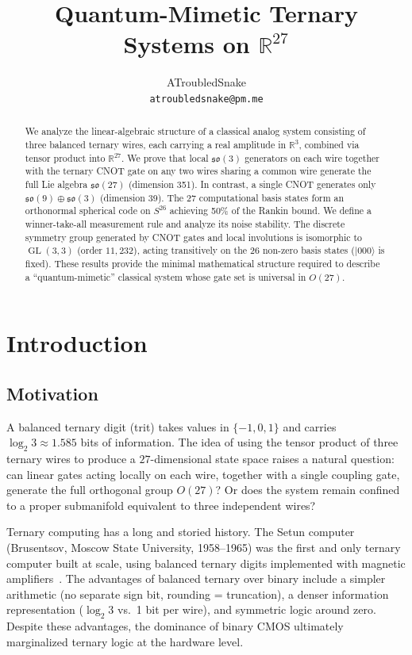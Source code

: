 \documentclass[12pt,a4paper]{article}
\title{Quantum-Mimetic Ternary Systems on $\mathbb{R}^{27}$}
\author{ATroubledSnake\\\texttt{atroubledsnake@pm.me}}
\date{}
\newcommand{\GL}{\operatorname{GL}}
\begin{document}
\maketitle

\begin{abstract}
We analyze the linear-algebraic structure of a classical analog system
consisting of three balanced ternary wires, each carrying a real amplitude
in $\mathbb{R}^3$, combined via tensor product into $\mathbb{R}^{27}$.
We prove that local $\mathfrak{so}(3)$ generators on each wire together
with the ternary CNOT gate on any two wires sharing a common wire generate
the full Lie algebra $\mathfrak{so}(27)$ (dimension 351). In contrast,
a single CNOT generates only $\mathfrak{so}(9) \oplus \mathfrak{so}(3)$
(dimension 39). The 27 computational basis states form an orthonormal
spherical code on $S^{26}$ achieving 50\% of the Rankin bound. We define
a winner-take-all measurement rule and analyze its noise stability.
The discrete symmetry group generated by CNOT gates and local involutions
is isomorphic to $\GL(3,3)$ (order $11{,}232$), acting transitively on the
26 non-zero basis states ($|000\rangle$ is fixed). These results provide the minimal mathematical structure
required to describe a ``quantum-mimetic'' classical system whose gate
set is universal in $O(27)$.
\end{abstract}

\section{Introduction}

\subsection{Motivation}

A balanced ternary digit (trit) takes values in $\{-1,0,1\}$ and carries
$\log_2 3 \approx 1.585$ bits of information. The idea of using the tensor
product of three ternary wires to produce a $27$-dimensional state space
raises a natural question: can linear gates acting locally on each wire,
together with a single coupling gate, generate the full orthogonal group
$O(27)$? Or does the system remain confined to a proper submanifold
equivalent to three independent wires?

Ternary computing has a long and storied history. The Setun computer
(Brusentsov, Moscow State University, 1958--1965) was the first and only
ternary computer built at scale, using balanced ternary digits implemented
with magnetic amplifiers~\cite{brusentsov1965}. The advantages of balanced
ternary over binary include a simpler arithmetic (no separate sign bit,
rounding = truncation), a denser information representation ($\log_2 3$
vs.\ 1 bit per wire), and symmetric logic around zero. Despite these
advantages, the dominance of binary CMOS ultimately marginalized ternary
logic at the hardware level.
\end{document}

